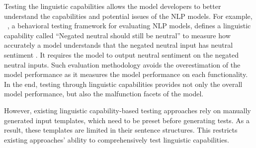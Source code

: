 Testing the linguistic capabilities allows the model developers to
better understand the capabilities and potential issues of the NLP
models.  For example, \Cklst~\cite{marcoACL2020checklist}, a
behavioral testing framework for evaluating NLP models, defines a
linguistic capability called ``Negated neutral should still be
neutral'' to measure how accurately a \sa model understands that the
negated neutral input has neutral sentiment
\cite{marcoACL2020checklist}.  It requires the \sa model to output
neutral sentiment on the negated neutral inputs.  Such evaluation
methodology avoids the overestimation of the model performance as it
measures the model performance on each functionality.
In the end, testing through linguistic capabilities provides not only
the overall model performance, but also the malfunction facets of the
model.
  
 However, existing linguistic capability-based testing approaches rely
 on manually generated input templates, which need to be preset before
 generating tests.  As a result, these templates are limited in their
 sentence structures. This restricts existing approaches' ability to
 comprehensively test linguistic capabilities.
  


